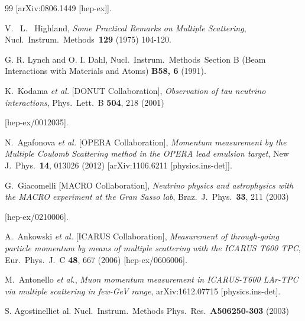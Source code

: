 \documentclass[a4paper,11pt]{article}
\begin{document}
\begin{thebibliography}{99}
  [arXiv:0806.1449 [hep-ex]].




  V. ~L. ~Highland, 
  \textit{Some Practical Remarks on Multiple Scattering},
  Nucl.\ Instrum.\ Methods\ {\bf 129} (1975)
  104-120.
 
  G. R. Lynch and O. I. Dahl, Nucl.\ Instrum.\ Methods\, 
  Section B (Beam Interactions with Materials and Atoms) {\bf B58, 6} (1991). 

  K.~Kodama {\it et al.} [DONUT Collaboration],
  \textit{Observation of tau neutrino interactions},
  Phys.\ Lett.\ B {\bf 504}, 218 (2001)

  [hep-ex/0012035].

  N.~Agafonova {\it et al.} [OPERA Collaboration],
  \textit{Momentum measurement by the Multiple Coulomb Scattering method in the OPERA lead emulsion target},
  New J.\ Phys.\  {\bf 14}, 013026 (2012)
  [arXiv:1106.6211 [physics.ins-det]].

 
  G.~Giacomelli [MACRO Collaboration],
  \textit{Neutrino physics and astrophysics with the MACRO experiment at the Gran Sasso lab},
  Braz.\ J.\ Phys.\  {\bf 33}, 211 (2003)

  [hep-ex/0210006].

  A.~Ankowski {\it et al.} [ICARUS Collaboration],
  \textit{Measurement of through-going particle momentum by means of multiple scattering with the ICARUS T600 TPC},
  Eur.\ Phys.\ J.\ C {\bf 48}, 667 (2006)
  [hep-ex/0606006].


  M.~Antonello {\it et al.},
  \textit{Muon momentum measurement in ICARUS-T600 LAr-TPC via multiple scattering in few-GeV range},
  arXiv:1612.07715 [physics.ins-det].


  S. Agostinelliet al. Nucl.\ Instrum.\ Methods Phys.\ Res.\ {\bf A506250-303} (2003)



\end{thebibliography}
\end{document}
